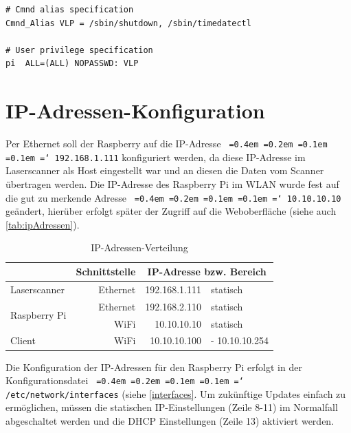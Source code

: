 \documentclass[a4paper,12pt,bibliography=totoc, listof=totoc,titlepage,pointlessnumbers]{scrreprt}
\newcommand*\justify{%
  \fontdimen2\font=0.4em%
  \fontdimen3\font=0.2em%
  \fontdimen4\font=0.1em%
  \fontdimen7\font=0.1em%
  \hyphenchar\font=`\-%
}
\newcommand{\code}[1]{\texttt{\justify{#1}}}
\begin{document}
\begin{lstlisting}[caption={Änderung der \code{/etc/sudoers}}, label={Lsudoers}]
# Cmnd alias specification
Cmnd_Alias VLP = /sbin/shutdown, /sbin/timedatectl

# User privilege specification
pi	ALL=(ALL) NOPASSWD: VLP
\end{lstlisting}

\section{IP-Adressen-Konfiguration}
Per Ethernet soll der Raspberry auf die IP-Adresse \code{192.168.1.111} konfiguriert werden, da diese IP-Adresse im Laser\-scan\-ner als Host eingestellt war und an diesen die Daten vom Scanner übertragen werden. Die IP-Adresse des Raspberry Pi im WLAN wurde fest auf die gut zu merkende Adresse \code{10.10.10.10} geändert, hierüber erfolgt später der Zugriff auf die Weboberfläche (siehe auch \autoref{tab:ipAdressen}).

\begin{table}
\centering
\begin{tabular}{l|r|r|l|}
\cline{2-4}
                                                    & Schnittstelle & \multicolumn{2}{c|}{IP-Adresse bzw. Bereich} \\ \hline
\multicolumn{1}{|l|}{Laser\-scan\-ner}                  & Ethernet      & 192.168.1.111        & statisch              \\ \hline
\multicolumn{1}{|l|}{\multirow{2}{*}{Raspberry Pi}} & Ethernet      & 192.168.2.110        & statisch              \\ \cline{2-4} 
\multicolumn{1}{|l|}{}                              & WiFi          & 10.10.10.10          & statisch              \\ \hline
\multicolumn{1}{|l|}{Client}                        & WiFi          & 10.10.10.100         & - 10.10.10.254        \\ \hline
\end{tabular}
\caption{IP-Adressen-Verteilung}
\label{tab:ipAdressen}
\end{table}

Die Konfiguration der IP-Adressen für den Raspberry Pi erfolgt in der Konfigurationsdatei \code{/etc/network/interfaces} (siehe \autoref{interfaces}. Um zukünftige Updates einfach zu ermöglichen, müssen die statischen IP-Einstellungen (Zeile 8-11) im Normalfall abgeschaltet werden und die DHCP Einstellungen (Zeile 13) aktiviert werden. \citep{accesspoint}
\end{document}
